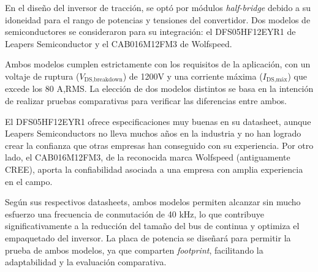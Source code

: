 En el diseño del inversor de tracción, se optó por módulos \textit{half-bridge} debido a su idoneidad para el rango de potencias y tensiones del convertidor. Dos modelos de semiconductores se consideraron para su integración: el DFS05HF12EYR1 de Leapers Semiconductor y el CAB016M12FM3 de Wolfspeed.

Ambos modelos cumplen estrictamente con los requisitos de la aplicación, con un voltaje de ruptura (\(V_{\text{DS,breakdown}}\)) de 1200V y una corriente máxima (\(I_{\text{DS,máx}}\)) que excede los 80 A,RMS. La elección de dos modelos distintos se basa en la intención de realizar pruebas comparativas para verificar las diferencias entre ambos.

El DFS05HF12EYR1 ofrece especificaciones muy buenas en su datasheet, aunque Leapers Semiconductors no lleva muchos años en la industria y no han logrado crear la confianza que otras empresas han conseguido con su experiencia. Por otro lado, el CAB016M12FM3, de la reconocida marca Wolfspeed (antiguamente CREE), aporta la confiabilidad asociada a una empresa con amplia experiencia en el campo.

Según sus respectivos datasheets, ambos modelos permiten alcanzar sin mucho esfuerzo una frecuencia de conmutación de 40 kHz, lo que contribuye significativamente a la reducción del tamaño del bus de continua y optimiza el empaquetado del inversor. La placa de potencia se diseñará para permitir la prueba de ambos modelos, ya que comparten \textit{footprint}, facilitando la adaptabilidad y la evaluación comparativa.

